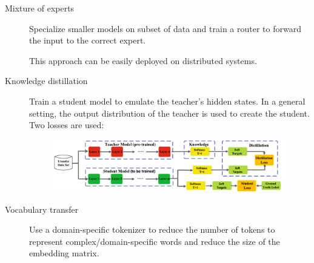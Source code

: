 \begin{description}
    \item[Mixture of experts] 
        Specialize smaller models on subset of data and train a router to forward the input to the correct expert.

        \begin{remark}
            This approach can be easily deployed on distributed systems.
        \end{remark}

    \item[Knowledge distillation] 
        Train a student model to emulate the teacher's hidden states. In a general setting, the output distribution of the teacher is used to create the student. Two losses are used:

        \begin{figure}[H]
            \centering
            \includegraphics[width=0.8\linewidth]{./img/_distillation.pdf}
        \end{figure}

    \item[Vocabulary transfer] 
        Use a domain-specific tokenizer to reduce the number of tokens to represent complex/domain-specific words and reduce the size of the embedding matrix.


\end{description}
